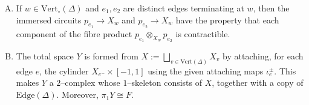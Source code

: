 \documentclass[11pt,oneside]{amsart}
\theoremstyle{definition}
\newcommand{\vertices}{\mathrm{Vert}}
\newcommand{\edges}{\mathrm{Edge}}
\begin{document}
\begin{enumerate}[(A)]
    \item If $w\in\vertices_\circ(\Delta)$ and $e_1,e_2$ are distinct edges terminating at $w$, then the immersed circuits $p_{e_1}\to X_w$ and $p_{e_2}\to X_w$ have the property that each component of the fibre product $p_{e_1}\otimes_{X_w}p_{e_2}$ is contractible. \label{item:multitwist-no-copy-p}

    \item The total space $Y$ is formed from $X:=\bigsqcup_{v\in\vertices(\Delta)}X_v$ by attaching, for each edge $e$, the cylinder $X_{e^-}\times[-1,1]$ using the given attaching maps $\iota_e^\pm$.  This makes $Y$ a $2$--complex whose $1$--skeleton consists of $X$, together with a copy of $\edges(\Delta)$.  Moreover, $\pi_1Y\cong F$. \label{item:multitwist-total}
\end{enumerate}
\end{document}

